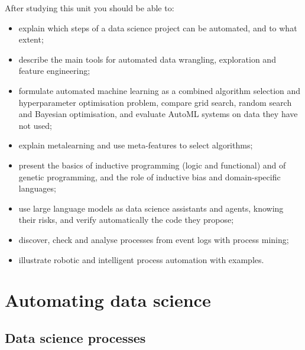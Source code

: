 \begin{objectives}
After studying this unit you should be able to:
\begin{itemize}
  \item explain which steps of a data science project can be automated, and to what extent;
  \item describe the main tools for automated data wrangling, exploration and feature engineering;
  \item formulate automated machine learning as a combined algorithm selection and hyperparameter
        optimisation problem, compare grid search, random search and Bayesian optimisation, and
        evaluate AutoML systems on data they have not used;
  \item explain metalearning and use meta-features to select algorithms;
  \item present the basics of inductive programming (logic and functional) and of genetic
        programming, and the role of inductive bias and domain-specific languages;
  \item use large language models as data science assistants and agents, knowing their risks, and
        verify automatically the code they propose;
  \item discover, check and analyse processes from event logs with process mining;
  \item illustrate robotic and intelligent process automation with examples.
\end{itemize}
\end{objectives}

\section{Automating data science}\label{sec:autods}

\subsection{Data science processes}


